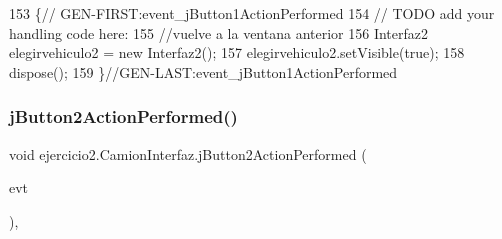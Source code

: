 \begin{DoxyCode}
153                                                                          \{\textcolor{comment}{//
      GEN-FIRST:event\_jButton1ActionPerformed}
154         \textcolor{comment}{// TODO add your handling code here:}
155         \textcolor{comment}{//vuelve a la ventana anterior}
156         Interfaz2 elegirvehiculo2 = \textcolor{keyword}{new} Interfaz2();
157         elegirvehiculo2.setVisible(\textcolor{keyword}{true});
158         dispose();
159     \}\textcolor{comment}{//GEN-LAST:event\_jButton1ActionPerformed}
\end{DoxyCode}
\mbox{\label{classejercicio2_1_1_camion_interfaz_ac15dc3135ad2cdd45b4760373de80418}} 
\subsubsection{\texorpdfstring{j\+Button2\+Action\+Performed()}{jButton2ActionPerformed()}}
{\footnotesize\ttfamily void ejercicio2.\+Camion\+Interfaz.\+j\+Button2\+Action\+Performed (\begin{DoxyParamCaption}\item[{java.\+awt.\+event.\+Action\+Event}]{evt }\end{DoxyParamCaption})\hspace{0.3cm}{\ttfamily [inline]}, {\ttfamily [private]}}


